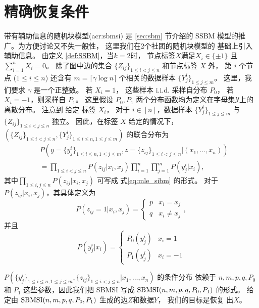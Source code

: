 \section{精确恢复条件}\label{sec:sbmsi_exact_recovery_condition}
带有辅助信息的随机块模型(\gls{acr:sbmsi})
是 \ref{sec:sbm} 节介绍的
SSBM 模型的推广。为方便讨论又不失一般性，
这里我们在2个社团的随机块模型的
基础上引入辅助信息。
由定义 \ref{def:SSBM}，当$k=2$时，
节点标签$X$满足$X_i \in \{\pm 1\}$
且 $\sum_{i=1}^n X_i = 0$。
除了图中边的集合
$\{Z_{ij}\}_{1\le i<j\le n}$
和节点标签 $X$ 外，
第 $i$  个节点 ($1\leq i \leq n$) 
还含有 $m=\lceil \gamma \log n \rceil $ 个相关的数据样本 
$\{Y^{i}_j\}_{1\leq j \leq m}$。
这里，我们要求 $\gamma$ 是一个正整数。
若 $X_i=1$，
这些样本 i.i.d. 采样自分布 $P_0$，
若 $X_i=-1$，则采样自 $P_1$。
这里假设 $P_0, P_1$ 两个分布函数均为定义在字母集$\mathcal{Y}$上的离散分布。
注意到 给定 标签 $X_i$，
对于 $i\in [n]$，数据样本 $\{Y^{i}_j\}_{1\leq j \leq m}$ 与 $\{Z_{ij}\}_{1\le i<j\le n}$ 独立。
因此，在标签 $X$ 给定的情况下，
  $(\{Z_{ij}\}_{1\le i<j\le n},\{Y^i_{j}\}_{1\le i\le n,1\le j\le m})$ 的联合分布为  
\begin{align}\label{eq:lh}
    &P(y=\{y^i_{j}\}_{1\le i\le n,1\le j\le m},z=\{z_{ij}\}_{1\le i<j\le n}| (x_1,\ldots,x_n)) \nonumber\\
    &= \prod_{1\le i < j\le n}P(z_{ij}|x_i,x_j)\prod_{i=1}^n \prod_{j=1}^m P(y^i_j|x_i), 
\end{align}
其中$\prod_{1\le i,j\le n}P(z_{ij}|x_i,x_j)$ 可写成
式\eqref{eq:mle_sibm} 的形式。
对于$P(z_{ij}|x_i,x_j)$，其具体定义为
\begin{equation*}
    P  (z_{ij}=1|x_i,x_j) = \begin{cases}
        p &   x_i = x_j \\
        q &   x_i\ne x_j
    \end{cases},
\end{equation*}
并且
\begin{equation*}
    P(y^i_j|x_i) = \begin{cases}
        P_0(y^i_j) & x_i = 1 \\
        P_1(y^i_j) & x_i = -1
    \end{cases}
\end{equation*}

 $P(\{y^i_{j}\}_{1\le i\le n,1\le j\le m},\{z_{ij}\}_{1\le i<j\le n}| x_1,\ldots,x_n)$ 
 的条件分布 依赖于
 $n,m,p, q, P_0$ 和 $P_1$ 这些参数，因此我们把 SBMSI 写成 $\operatorname{SBMSI}(n,m,p,q,P_0,P_1)$ 的形式。
 给定由 $\operatorname{SBMSI}(n,m,p,q,P_0,P_1)$ 生成的边$Z$和数据$Y$， 我们的目标是恢复 出$X$。
 
